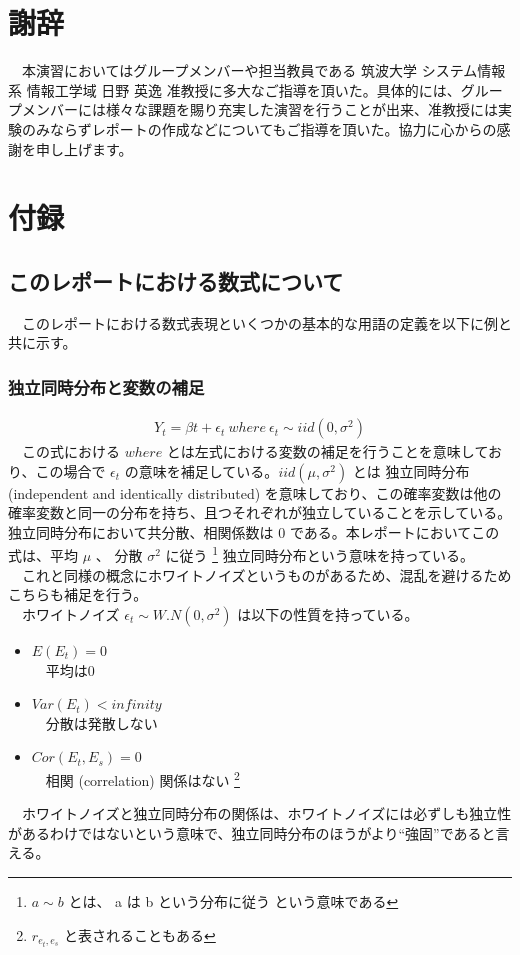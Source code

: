 \documentclass{scrartcl}
\begin{document}
\section{謝辞}
\label{sec:orgab0062c}
　本演習においてはグループメンバーや担当教員である 筑波大学 システム情報系 情報工学域 日野 英逸 准教授に多大なご指導を頂いた。具体的には、グループメンバーには様々な課題を賜り充実した演習を行うことが出来、准教授には実験のみならずレポートの作成などについてもご指導を頂いた。協力に心からの感謝を申し上げます。

\section{付録}
\label{sec:orgf55781c}
\subsection{このレポートにおける数式について}
\label{sec:orgc97f0cc}
　このレポートにおける数式表現といくつかの基本的な用語の定義を以下に例と共に示す。\\
\subsubsection{独立同時分布と変数の補足}
\label{sec:org6fbf02b}
\begin{align}
Y_t = \beta t + \epsilon_t \ where \ \epsilon_t \sim iid(0, \sigma^2)
\end{align}
　この式における \(where\) とは左式における変数の補足を行うことを意味しており、この場合で \(\epsilon_t\) の意味を補足している。\(iid(\mu, \sigma^2)\) とは 独立同時分布 (independent and identically distributed) を意味しており、この確率変数は他の確率変数と同一の分布を持ち、且つそれぞれが独立していることを示している。独立同時分布において共分散、相関係数は 0 である。本レポートにおいてこの式は、平均 \(\mu\) 、 分散 \(\sigma^2\) に従う \footnote{$a \sim b$ とは、 a は b という分布に従う という意味である} 独立同時分布という意味を持っている。\\
　これと同様の概念にホワイトノイズというものがあるため、混乱を避けるためこちらも補足を行う。\\
　ホワイトノイズ \(\epsilon_t \sim W.N(0, \sigma^2)\) は以下の性質を持っている。\\
\begin{itemize}
\item \(E(E_t) = 0\) \\
　平均は0\\
\item \(Var(E_t) < infinity\) \\
　分散は発散しない\\
\item \(Cor(E_t, E_s) = 0\) \\
　相関 (correlation) 関係はない \footnote{$r_{e_t, e_s}$ と表されることもある} \\
\end{itemize}
　ホワイトノイズと独立同時分布の関係は、ホワイトノイズには必ずしも独立性があるわけではないという意味で、独立同時分布のほうがより``強固''であると言える。　\\
\end{document}
